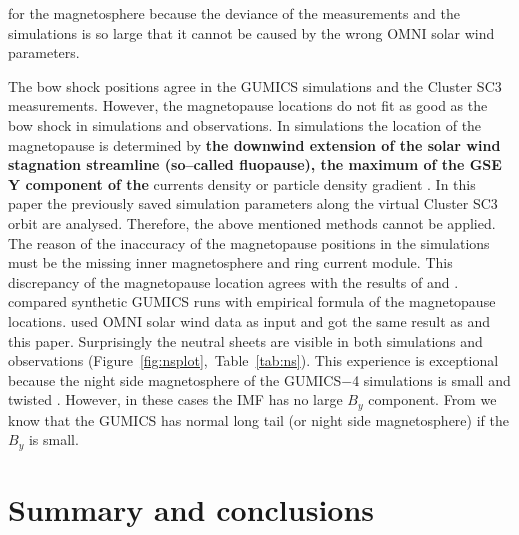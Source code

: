 \documentclass[linenumbers,draft]{agujournal}
\begin{document}
for the magnetosphere because the deviance of the measurements and the simulations is so large that it cannot be caused by the wrong OMNI solar wind parameters.

The bow shock positions agree in the GUMICS simulations and the Cluster SC3 measurements. However, the magnetopause locations do not fit as good as the bow shock in simulations and observations. In simulations the location of the magnetopause is determined by \textbf{the downwind extension of the solar wind stagnation streamline (so--called fluopause), the maximum of the GSE Y component of the} currents density or particle density gradient \citep[][see references therein]{siscoe01:_magnet_fluop,garcia07:_findin_lyon_fedder_mobar,gordeev13:_verif_gumic_mhd}. In this paper the previously saved simulation parameters along the virtual Cluster SC3 orbit are analysed. Therefore, the above mentioned methods cannot be applied. The reason of the inaccuracy of the magnetopause positions in the simulations must be the missing inner magnetosphere and ring current module. This discrepancy of the magnetopause location agrees with the results of \citet{gordeev13:_verif_gumic_mhd} and \citet{facsko16:_one_earth}. \citet{gordeev13:_verif_gumic_mhd} compared synthetic GUMICS runs with empirical formula of the magnetopause locations. \citet{facsko16:_one_earth} used OMNI solar wind data as input and got the same result as \citet{gordeev13:_verif_gumic_mhd} and this paper. Surprisingly the neutral sheets are visible in both simulations and observations (Figure~\ref{fig:nsplot},~Table~\ref{tab:ns}). This experience is exceptional because the night side magnetosphere of the GUMICS$-$4 simulations is small and twisted \citep{gordeev13:_verif_gumic_mhd,facsko16:_one_earth}. However, in these cases the IMF has no large $B_{y}$ component. From \citet{facsko16:_one_earth} we know that the GUMICS has normal long tail (or night side magnetosphere) if the $B_{y}$ is small.

\section{Summary and conclusions}
\label{sec:concl}
\end{document}
